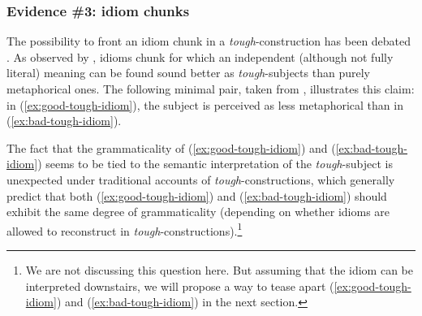 \documentclass[11pt]{article}
\begin{document}
\subsubsection{Evidence \#3: idiom chunks}
The possibility to front an idiom chunk in a \textit{tough}-construction has been debated \cite{Lasnik1974,Rezac2006,Hicks2009}. As observed by \cite{Longenbaugh2017}, idioms chunk for which an independent (although not fully literal) meaning can be found sound better as \textit{tough}-subjects than purely metaphorical ones. The following minimal pair, taken from \cite{Longenbaugh2017}, illustrates this claim: in (\ref{ex:good-tough-idiom}), the subject is perceived as less metaphorical than in (\ref{ex:bad-tough-idiom}).
\begin{exe}
	\ex 
	\begin{xlist}
		\label{ex:good-tough-idiom}
		\label{ex:bad-tough-idiom}
	\end{xlist}\label{ex:tough-idioms}
\end{exe}
The fact that the grammaticality of (\ref{ex:good-tough-idiom}) and  (\ref{ex:bad-tough-idiom}) seems to be tied to the semantic interpretation of the \textit{tough}-subject is unexpected under traditional accounts of \textit{tough}-constructions, which generally predict that both (\ref{ex:good-tough-idiom}) and (\ref{ex:bad-tough-idiom}) should exhibit the same degree of grammaticality (depending on whether idioms are allowed to reconstruct in \textit{tough}-constructions).\footnote{We are not discussing this question here. But assuming that the idiom can be interpreted downstairs, we will propose a way to tease apart (\ref{ex:good-tough-idiom}) and (\ref{ex:bad-tough-idiom}) in the next section.}
\end{document}

